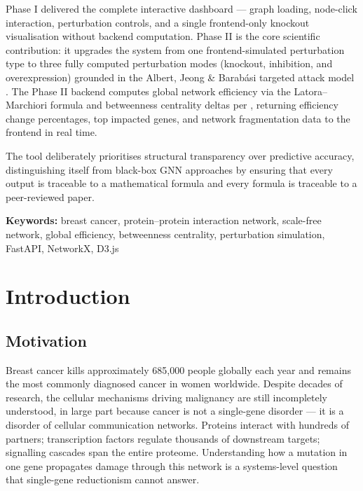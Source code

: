 \documentclass[12pt,a4paper]{report}
\begin{document}
Phase I delivered the complete interactive dashboard — graph loading, node-click interaction, perturbation controls, and a single frontend-only knockout visualisation without backend computation. Phase II is the core scientific contribution: it upgrades the system from one frontend-simulated perturbation type to three fully computed perturbation modes (knockout, inhibition, and overexpression) grounded in the Albert, Jeong \& Barab\'asi targeted attack model \citep{albert2000error}. The Phase II backend computes global network efficiency via the Latora--Marchiori formula \citep{latora2001efficient} and betweenness centrality deltas per \citet{freeman1977set}, returning efficiency change percentages, top impacted genes, and network fragmentation data to the frontend in real time.

The tool deliberately prioritises structural transparency over predictive accuracy, distinguishing itself from black-box GNN approaches \citep{roohani2023gears, petre2022explainability} by ensuring that every output is traceable to a mathematical formula and every formula is traceable to a peer-reviewed paper.

\vspace{1em}
\noindent\textbf{Keywords:} breast cancer, protein–protein interaction network, scale-free network, global efficiency, betweenness centrality, perturbation simulation, FastAPI, NetworkX, D3.js

\tableofcontents
\listoffigures
\listoftables

\chapter{Introduction}

\section{Motivation}

Breast cancer kills approximately 685{,}000 people globally each year and remains the most commonly diagnosed cancer in women worldwide. Despite decades of research, the cellular mechanisms driving malignancy are still incompletely understood, in large part because cancer is not a single-gene disorder — it is a disorder of cellular communication networks. Proteins interact with hundreds of partners; transcription factors regulate thousands of downstream targets; signalling cascades span the entire proteome. Understanding how a mutation in one gene propagates damage through this network is a systems-level question that single-gene reductionism cannot answer.
\end{document}
